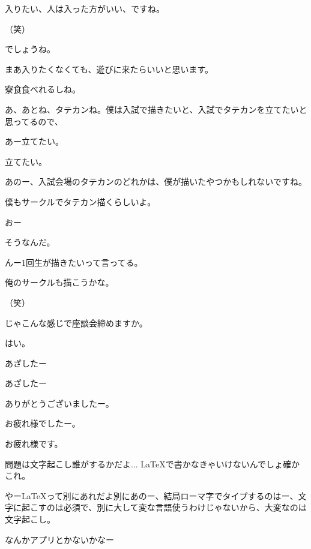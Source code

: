 \begin{multicols}{3}
{        入りたい、人は入った方がいい、ですね。

        （笑）

        でしょうね。

        まあ入りたくなくても、遊びに来たらいいと思います。

        寮食食べれるしね。

        あ、あとね、タテカンね。僕は入試で描きたいと、入試でタテカンを立てたいと思ってるので、

        あー立てたい。

        立てたい。

        あのー、入試会場のタテカンのどれかは、僕が描いたやつかもしれないですね。

        僕もサークルでタテカン描くらしいよ。

        おー

        そうなんだ。

        んー1回生が描きたいって言ってる。

        俺のサークルも描こうかな。

        （笑）

        じゃこんな感じで座談会締めますか。

        はい。

        あざしたー

        あざしたー

        ありがとうございましたー。

        お疲れ様でしたー。

        お疲れ様です。

        問題は文字起こし誰がするかだよ... \LaTeX で書かなきゃいけないんでしょ確かこれ。

        やー\LaTeX って別にあれだよ別にあのー、結局ローマ字でタイプするのはー、文字に起こすのは必須で、別に大して変な言語使うわけじゃないから、大変なのは文字起こし。

        なんかアプリとかないかなー

    }
    

\end{multicols}


